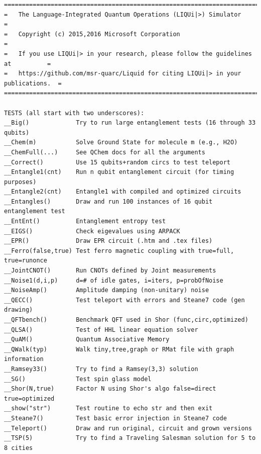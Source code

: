 \documentclass[12pt]{third-rep}
\begin{document}
\begin{verbatim}
===================================================================================
=   The Language-Integrated Quantum Operations (LIQUi|>) Simulator                =
=   Copyright (c) 2015,2016 Microsoft Corporation                                 =
=   If you use LIQUi|> in your research, please follow the guidelines at          =
=   https://github.com/msr-quarc/Liquid for citing LIQUi|> in your publications.  =
===================================================================================

TESTS (all start with two underscores):
__Big()             Try to run large entanglement tests (16 through 33 qubits)
__Chem(m)           Solve Ground State for molecule m (e.g., H2O)
__ChemFull(...)     See QChem docs for all the arguments
__Correct()         Use 15 qubits+random circs to test teleport
__Entangle1(cnt)    Run n qubit entanglement circuit (for timing purposes)
__Entangle2(cnt)    Entangle1 with compiled and optimized circuits
__Entangles()       Draw and run 100 instances of 16 qubit entanglement test
__EntEnt()          Entanglement entropy test
__EIGS()            Check eigevalues using ARPACK
__EPR()             Draw EPR circuit (.htm and .tex files)
__Ferro(false,true) Test ferro magnetic coupling with true=full, true=runonce
__JointCNOT()       Run CNOTs defined by Joint measurements
__Noise1(d,i,p)     d=# of idle gates, i=iters, p=probOfNoise
__NoiseAmp()        Amplitude damping (non-unitary) noise
__QECC()            Test teleport with errors and Steane7 code (gen drawing)
__QFTbench()        Benchmark QFT used in Shor (func,circ,optimized)
__QLSA()            Test of HHL linear equation solver
__QuAM()            Quantum Associative Memory
__QWalk(typ)        Walk tiny,tree,graph or RMat file with graph information
__Ramsey33()        Try to find a Ramsey(3,3) solution
__SG()              Test spin glass model
__Shor(N,true)      Factor N using Shor's algo false=direct true=optimized
__show("str")       Test routine to echo str and then exit
__Steane7()         Test basic error injection in Steane7 code
__Teleport()        Draw and run original, circuit and grown versions
__TSP(5)            Try to find a Traveling Salesman solution for 5 to 8 cities
\end{verbatim}
\end{document}
